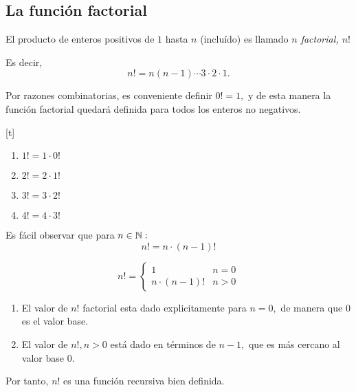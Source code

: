 \subsection{La funci\'on factorial}


	El producto de enteros positivos de $1$ hasta $n$ (inclu\'ido) es llamado \emph{$n$ factorial, $n!$}
	
	Es decir, 
	$$
	n!=n(n-1)\cdots 3\cdot 2 \cdot 1.$$
	



	Por razones combinatorias, es conveniente definir \emph{$0!=1,$} y de esta manera la funci\'on factorial quedar\'a definida para todos los enteros no negativos.


[t]
	\begin{rem}
		\begin{enumerate}
			\item $1!=1\cdot0!$
			\item $2!=2\cdot1!$
			\item $3!=3\cdot2!$
			\item $4!=4\cdot3!$
		\end{enumerate}
		
	\end{rem}
	



	Es f\'acil observar que para $n \in \mathbb{N}:$
	$$
	n!=n\cdot (n-1)!
	$$



	\begin{defn}
		$$n!=
		\begin{cases}
			1 & n=0 \\
			n\cdot(n-1)! & n>0
		\end{cases}
		$$
	\end{defn}
	



	\begin{rem}
		\begin{enumerate}
			\item El valor de $n!$ factorial esta dado explicitamente para $n=0,$ de manera que $0$ es el valor base. 
			\item El valor de $n!, n>0$ est\'a dado en t\'erminos de $n-1,$ que es m\'as cercano al valor base $0.$    
		\end{enumerate}
		
		Por tanto, $n!$ es una funci\'on recursiva bien definida.
	\end{rem}
	


